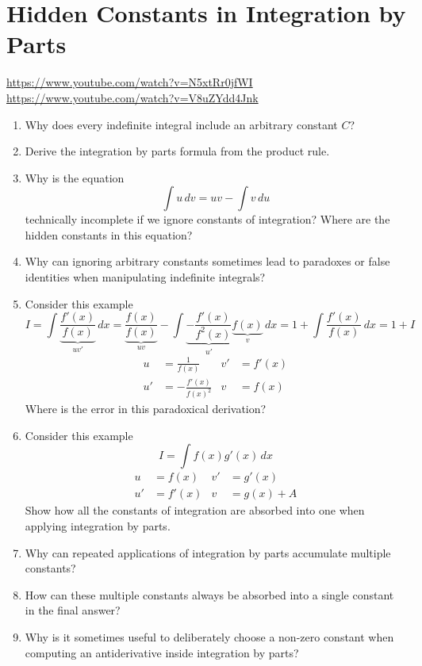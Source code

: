 \section{Hidden Constants in Integration by Parts}

\url{https://www.youtube.com/watch?v=N5xtRr0jfWI} \\
\url{https://www.youtube.com/watch?v=V8uZYdd4Jnk}

\begin{enumerate}
  \item Why does every indefinite integral include an arbitrary constant $C$?
  \item Derive the integration by parts formula from the product rule.
  \item Why is the equation
    \[
      \int u\,dv = uv - \int v\,du
    \]
    technically incomplete if we ignore constants of integration? Where are the hidden constants in this equation?
  \item Why can ignoring arbitrary constants sometimes lead to paradoxes or false identities when manipulating indefinite integrals?
  \item Consider this example
    \[
      I = \int \underbrace{\frac{f'(x)}{f(x)}}_{uv'} \, dx =
      \underbrace{\frac{f(x)}{f(x)}}_{uv} - \int \underbrace{-\frac{f'(x)}{f^2(x)}}_{u'} \underbrace{f(x)}_{v} \, dx =
      1 + \int \frac{f'(x)}{f(x)} \, dx =
      1 + I
    \]
    \begin{align*}
      u  &= \frac{1}{f(x)}        & v' &= f'(x) \\
      u' &= -\frac{f'(x)}{f(x)^2} & v  &= f(x)
    \end{align*}
    Where is the error in this paradoxical derivation?
  \item Consider this example
    \[
      I = \int f(x)g'(x) \, dx
    \]
    \begin{align*}
      u  &= f(x)  & v' &= g'(x) \\
      u' &= f'(x) & v  &= g(x) + A
    \end{align*}
    Show how all the constants of integration are absorbed into one when applying integration by parts.
  \item Why can repeated applications of integration by parts accumulate multiple constants?
  \item How can these multiple constants always be absorbed into a single constant in the final answer?
  \item Why is it sometimes useful to deliberately choose a non-zero constant when computing an antiderivative inside integration by parts?

\end{enumerate}

